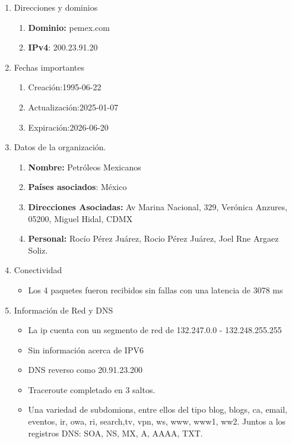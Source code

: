 \begin{enumerate}
    \item Direcciones y dominios
    \begin{enumerate}
        \item \textbf{Dominio:} pemex.com
        \item \textbf{IPv4}: 200.23.91.20
    \end{enumerate}
    \item Fechas importantes
    \begin{enumerate}
        \item Creación:1995-06-22
        \item Actualización:2025-01-07
        \item Expiración:2026-06-20
    \end{enumerate}
    \item Datos de la organización.

    \begin{enumerate}
        \item \textbf{Nombre:} Petróleos Mexicanos
        \item \textbf{Países asociados}: México 
        \item \textbf{Direcciones Asociadas:} Av Marina Nacional, 329, Verónica Anzures, 05200, Miguel Hidal, CDMX
        \item \textbf{Personal:} Rocío Pérez Juárez, Rocio Pérez Juárez, Joel Rne Argaez Soliz.
    \end{enumerate}

    \item Conectividad
    \begin{itemize}
        \item Los 4 paquetes fueron recibidos sin fallas con una latencia de 3078 ms 
    \end{itemize}

    \item Información de Red y DNS
    \begin{itemize}
        \item La ip cuenta con un segmento de red de 132.247.0.0 - 132.248.255.255
        \item Sin información acerca de IPV6
        \item DNS reverso como 20.91.23.200
        \item Traceroute completado en 3 saltos.
        \item Una variedad de subdomions, entre ellos del tipo blog, blogs, ca, email, eventos, ir, owa, ri, search,tv, vpn, ws, www, www1, ww2. Juntos a los registros DNS: SOA, NS, MX, A, AAAA, TXT.


\end{itemize}
\end{enumerate}
